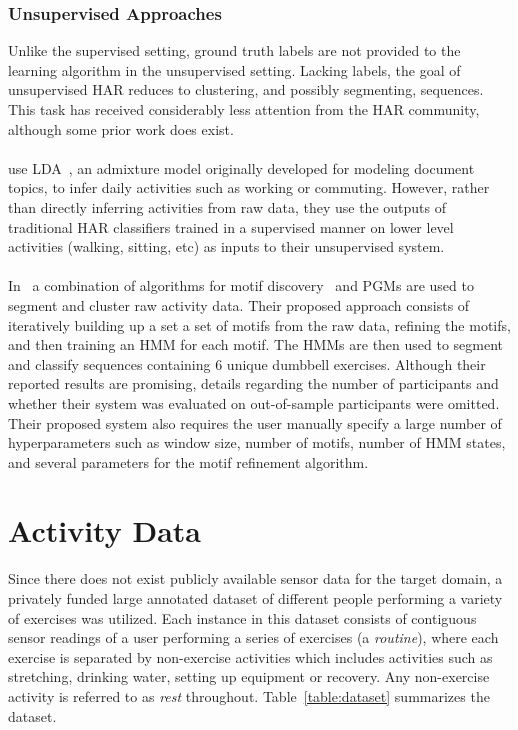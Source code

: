 \documentclass[12pt]{report}
\newcommand{\1}[0]{\mathbbm{1}}
\begin{document}
\subsection{Unsupervised Approaches}
Unlike the supervised setting, ground truth labels are not provided to the learning
algorithm in the unsupervised setting. Lacking labels, the goal of unsupervised \ac{HAR}
reduces to clustering, and possibly segmenting, sequences. This task has received considerably
less attention from the \ac{HAR} community, although some prior work does exist.
\\\\
\cite{har-topic-models} use \ac{LDA}~\cite{lda-blei}, an admixture model originally
developed for modeling document topics, to infer daily activities such as working or
commuting. However, rather than directly inferring activities from raw data, they use the
outputs of traditional \ac{HAR} classifiers trained in a supervised manner on lower level
activities (walking, sitting, etc) as inputs to their unsupervised system.
\\\\
In~\cite{hmm-motifs} a combination of algorithms for motif discovery~\cite{motif-algo} and \acp{PGM}
are used to segment and cluster raw activity data. Their proposed approach consists of
iteratively building up a set a set of motifs from the raw data, refining the motifs,
and then training an \ac{HMM} for each motif. The \acp{HMM} are then used to segment and classify
sequences containing 6 unique dumbbell exercises. Although their reported results are promising,
details regarding the number of participants and whether their system was evaluated on
out-of-sample participants were omitted. Their proposed system also requires the user manually
specify a large number of hyperparameters such as window size, number of motifs, number of \ac{HMM} states,
and several parameters for the motif refinement algorithm.

\chapter{Activity Data}
\label{chap:Activity Data}
Since there does not exist publicly available sensor data for the target domain, a privately funded
large annotated dataset of different people performing a variety of exercises was utilized.
Each instance in this dataset consists of contiguous sensor readings of a user performing a
series of exercises (a \emph{routine}), where each exercise is separated by non-exercise activities
which includes activities such as stretching, drinking water, setting up  equipment or recovery.
Any non-exercise activity is referred to as \emph{rest} throughout. Table~\ref{table:dataset} summarizes
the dataset.
\end{document}
